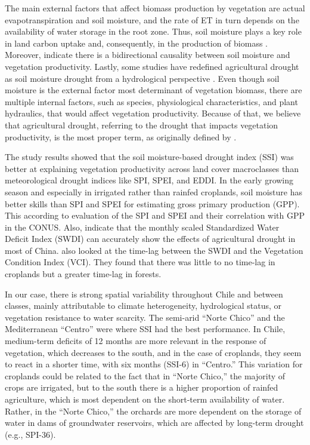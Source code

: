 \documentclass[
  authoryear,
  preprint,
  3p,
  onecolumn]{elsarticle}
\begin{document}
The main external factors that affect biomass production by vegetation
are actual evapotranspiration and soil moisture, and the rate of ET in
turn depends on the availability of water storage in the root zone.
Thus, soil moisture plays a key role in land carbon uptake and,
consequently, in the production of biomass \citep{Humphrey2021}.
Moreover, \citet{Zhang2022} indicate there is a bidirectional causality
between soil moisture and vegetation productivity. Lastly, some studies
have redefined agricultural drought as soil moisture drought from a
hydrological perspective \citep{Loon2016, Samaniego2018}. Even though
soil moisture is the external factor most determinant of vegetation
biomass, there are multiple internal factors, such as species,
physiological characteristics, and plant hydraulics, that would affect
vegetation productivity. Because of that, we believe that agricultural
drought, referring to the drought that impacts vegetation productivity,
is the most proper term, as originally defined by \citet{Wilhite1985}.

The study results showed that the soil moisture-based drought index
(SSI) was better at explaining vegetation productivity across land cover
macroclasses than meteorological drought indices like SPI, SPEI, and
EDDI. In the early growing season and especially in irrigated rather
than rainfed croplands, soil moisture has better skills than SPI and
SPEI for estimating gross primary production (GPP). This according to
\citet{Chatterjee2022} evaluation of the SPI and SPEI and their
correlation with GPP in the CONUS. Also, \citet{Zhou2021} indicate that
the monthly scaled Standardized Water Deficit Index (SWDI) can
accurately show the effects of agricultural drought in most of China.
\citet{Nicolai2017} also looked at the time-lag between the SWDI and the
Vegetation Condition Index (VCI). They found that there was little to no
time-lag in croplands but a greater time-lag in forests.

In our case, there is strong spatial variability throughout Chile and
between classes, mainly attributable to climate heterogeneity,
hydrological status, or vegetation resistance to water scarcity. The
semi-arid ``Norte Chico'' and the Mediterranean ``Centro'' were where
SSI had the best performance. In Chile, medium-term deficits of 12
months are more relevant in the response of vegetation, which decreases
to the south, and in the case of croplands, they seem to react in a
shorter time, with six months (SSI-6) in ``Centro.'' This variation for
croplands could be related to the fact that in ``Norte Chico,'' the
majority of crops are irrigated, but to the south there is a higher
proportion of rainfed agriculture, which is most dependent on the
short-term availability of water. Rather, in the ``Norte Chico,'' the
orchards are more dependent on the storage of water in dams of
groundwater reservoirs, which are affected by long-term drought (e.g.,
SPI-36).
\end{document}
